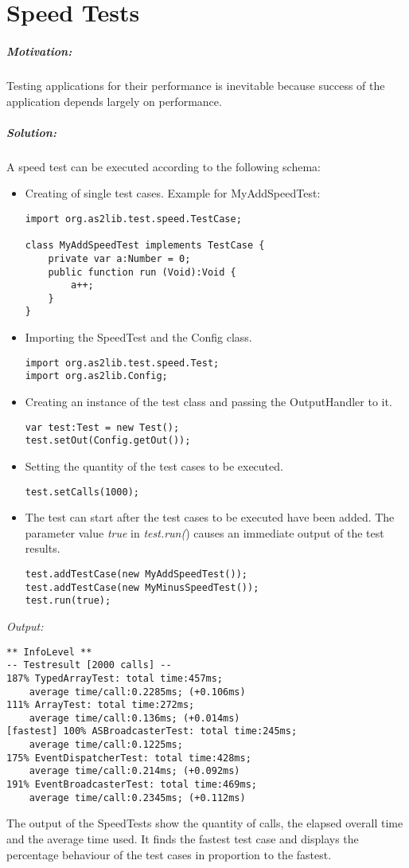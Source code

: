 \chapter{Speed Tests}
\label{sec:SpeedTests}

\paragraph{Motivation:}
Testing applications for their performance is inevitable because success of the application depends largely on performance.

\paragraph{Solution:}
A speed test can be executed according to the following schema:
\begin{itemize}
	\item Creating of single test cases.
	Example for MyAddSpeedTest:
\begin{lstlisting}[frame=single]
import org.as2lib.test.speed.TestCase;

class MyAddSpeedTest implements TestCase {
	private var a:Number = 0;
	public function run (Void):Void {
		a++;
	}
}
\end{lstlisting}
	\item Importing the SpeedTest and the Config class.
\begin{lstlisting}[frame=single]
import org.as2lib.test.speed.Test;
import org.as2lib.Config;
\end{lstlisting}
	\item Creating an instance of the test class and passing the OutputHandler to it.
\begin{lstlisting}[frame=single]
var test:Test = new Test();
test.setOut(Config.getOut());
\end{lstlisting}
	\item Setting the quantity of the test cases to be executed.
\begin{lstlisting}[frame=single]
test.setCalls(1000);
\end{lstlisting}
	\item The test can start after the test cases to be executed have been added. The parameter value \emph{true} in \emph{test.run(}) causes an immediate output of the test results.
\begin{lstlisting}[frame=single]
test.addTestCase(new MyAddSpeedTest());
test.addTestCase(new MyMinusSpeedTest());
test.run(true);
\end{lstlisting}
\end{itemize}
\clearpage
\emph{Output:}
\begin{lstlisting}[frame=single]
** InfoLevel **
-- Testresult [2000 calls] --
187% TypedArrayTest: total time:457ms; 
	average time/call:0.2285ms; (+0.106ms)
111% ArrayTest: total time:272ms; 
	average time/call:0.136ms; (+0.014ms)
[fastest] 100% ASBroadcasterTest: total time:245ms; 
	average time/call:0.1225ms;
175% EventDispatcherTest: total time:428ms; 
	average time/call:0.214ms; (+0.092ms)
191% EventBroadcasterTest: total time:469ms; 
	average time/call:0.2345ms; (+0.112ms)
\end{lstlisting}

The output of the SpeedTests show the quantity of calls, the elapsed overall time and the average time used. It finds the fastest test case and displays the percentage behaviour of the test cases in proportion to the fastest.
